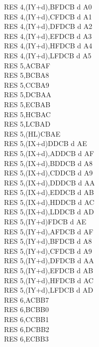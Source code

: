 \begin{multicols}{3}
{\begin{tabbing}
        RES 4,(IY+d),B\UNDOC\>FDCB d A0\\
        RES 4,(IY+d),C\UNDOC\>FDCB d A1\\
        RES 4,(IY+d),D\UNDOC\>FDCB d A2\\
        RES 4,(IY+d),E\UNDOC\>FDCB d A3\\
        RES 4,(IY+d),H\UNDOC\>FDCB d A4\\
        RES 4,(IY+d),L\UNDOC\>FDCB d A5\\
        RES 5,A\>CBAF\\
        RES 5,B\>CBA8\\
        RES 5,C\>CBA9\\
        RES 5,D\>CBAA\\
        RES 5,E\>CBAB\\
        RES 5,H\>CBAC\\
        RES 5,L\>CBAD\\
        RES 5,(HL)\>CBAE\\
        RES 5,(IX+d)\>DDCB d AE\\
        RES 5,(IX+d),A\UNDOC\>DDCB d AF\\
        RES 5,(IX+d),B\UNDOC\>DDCB d A8\\
        RES 5,(IX+d),C\UNDOC\>DDCB d A9\\
        RES 5,(IX+d),D\UNDOC\>DDCB d AA\\
        RES 5,(IX+d),E\UNDOC\>DDCB d AB\\
        RES 5,(IX+d),H\UNDOC\>DDCB d AC\\
        RES 5,(IX+d),L\UNDOC\>DDCB d AD\\
        RES 5,(IY+d)\>FDCB d AE\\
        RES 5,(IY+d),A\UNDOC\>FDCB d AF\\
        RES 5,(IY+d),B\UNDOC\>FDCB d A8\\
        RES 5,(IY+d),C\UNDOC\>FDCB d A9\\
        RES 5,(IY+d),D\UNDOC\>FDCB d AA\\
        RES 5,(IY+d),E\UNDOC\>FDCB d AB\\
        RES 5,(IY+d),H\UNDOC\>FDCB d AC\\
        RES 5,(IY+d),L\UNDOC\>FDCB d AD\\
        RES 6,A\>CBB7\\
        RES 6,B\>CBB0\\
        RES 6,C\>CBB1\\
        RES 6,D\>CBB2\\
        RES 6,E\>CBB3\\

\end{tabbing}}
\end{multicols}

